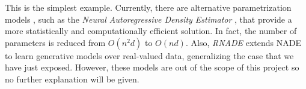
This is the simplest example. Currently, there are alternative parametrization models , such as the \emph{Neural Autoregressive Density Estimator} \citep{larochelle_neural_nodate}, that provide a more statistically and computationally efficient solution. In fact, the number of parameters is reduced from $O(n^2 d)$ to $O(nd)$. Also, \emph{RNADE} \citep{uria_rnade_2014} extends NADE to learn generative models over real-valued data, generalizing the case that we have just exposed. However, these models are out of the scope of this project so no further explanation will be given.

